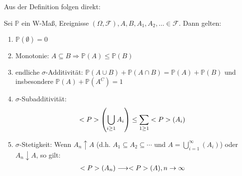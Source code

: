 Aus der Definition folgen direkt:

\begin{proposition}
	Sei $\mathbb{P}$ ein W-Maß, Ereignisse $(\Omega, \mathscr{F}), A, B, A_1, A_2, \dots \in \mathscr{F}$. Dann gelten:
	\begin{enumerate}
		\item $\mathbb{P}(\emptyset) = 0$
		\item Monotonie: $A \subseteq B \Rightarrow \mathbb{P}(A) \le \mathbb{P}(B)$
		\item endliche $\sigma$-Additivität: $\mathbb{P}(A\cup B) + \mathbb{P}(A\cap B) = \mathbb{P}(A) + \mathbb{P}(B)$ und insbesondere $\mathbb{P}(A) + \mathbb{P}(A^C) = 1$
		\item $\sigma$-Subadditivität:
		\begin{align}
			\mathbb{P}\left(\bigcup_{i \ge 1} A_i\right) \le \sum_{1 \ge 1} \mathbb{P}(A_i)\notag
		\end{align}
		\item $\sigma$-Stetigkeit: Wenn $A_n \uparrow A$ (d.h. $A_1 \subseteq A_2 \subseteq \cdots$ und $A = \bigcup_{i=1}^{\infty} (A_i)$) oder $A_n \downarrow A$, so gilt:
		\begin{align}
			\mathbb{P}(A_n) \longrightarrow \mathbb{P}(A), n \to \infty \notag
		\end{align}
	\end{enumerate}
\end{proposition}

